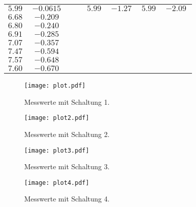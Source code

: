 \documentclass[
  bibliography=totoc,     %
  captions=tableheading,  %
  titlepage=firstiscover, %
]{scrartcl}
\begin{document}
\begin{table}
\begin{tabular}{c c c c c c c c}
    $\SI{ 5.99}{}$  & $\SI{-0.0615}{}$  &                &                   & $\SI{ 5.99}{}$  & $\SI{-1.27}{}$  & $\SI{ 5.99}{}$ & $\SI{-2.09}{}$   \\
    $\SI{ 6.68}{}$  & $\SI{-0.209}{}$   &                &                   &                 &                 &                &                  \\
    $\SI{ 6.80}{}$  & $\SI{-0.240}{}$   &                &                   &                 &                 &                &                  \\
    $\SI{ 6.91}{}$  & $\SI{-0.285}{}$   &                &                   &                 &                 &                &                  \\
    $\SI{ 7.07}{}$  & $\SI{-0.357}{}$   &                &                   &                 &                 &                &                  \\
    $\SI{ 7.47}{}$  & $\SI{-0.594}{}$   &                &                   &                 &                 &                &                  \\
    $\SI{ 7.57}{}$  & $\SI{-0.648}{}$   &                &                   &                 &                 &                &                  \\
    $\SI{ 7.60}{}$  & $\SI{-0.670}{}$   &                &                   &                 &                 &                &                  \\
    \bottomrule
  \end{tabular}
\end{table}
\begin{figure}
  \centering
  \texttt{[image: plot.pdf]}
  \caption{Messwerte mit Schaltung 1.}
  \label{fig:plot}
\end{figure}
\begin{figure}
  \centering
  \texttt{[image: plot2.pdf]}
  \caption{Messwerte mit Schaltung 2.}
  \label{fig:plot2}
\end{figure}
\begin{figure}
  \centering
  \texttt{[image: plot3.pdf]}
  \caption{Messwerte mit Schaltung 3.}
  \label{fig:plot3}
\end{figure}
\begin{figure}[H]
  \centering
  \texttt{[image: plot4.pdf]}
  \caption{Messwerte mit Schaltung 4.}
  \label{fig:plot4}
\end{figure}
\end{document}
